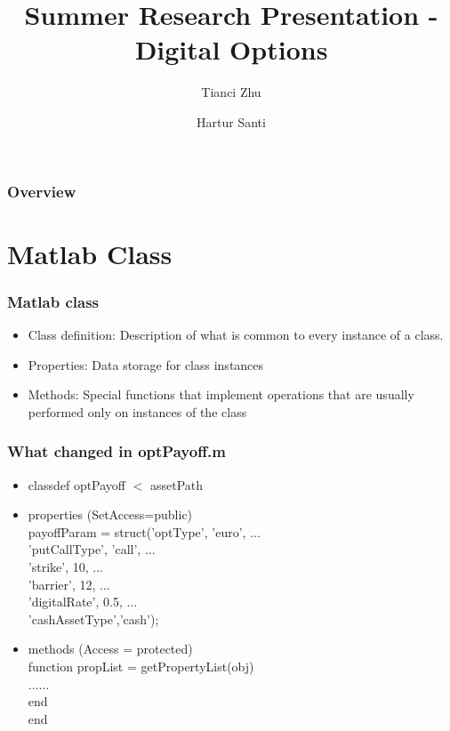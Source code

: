 \documentclass[10pt,Compress]{beamer}
\title[Options]{Summer Research Presentation - Digital Options}
\author{Tianci Zhu \and Hartur Santi}
\institute[IIT]{Illinois Institute of Technology}
\begin{document}
\titlepage


\begin{frame}
\frametitle{Overview}
\tableofcontents
\end{frame}

\section{Matlab Class}
\begin{frame}
\frametitle{Matlab class}
\begin{itemize}
\item Class definition: Description of what is common to every instance of a class.
\item Properties: Data storage for class instances
\item Methods: Special functions that implement operations that are usually performed only on instances of the class
\end{itemize}
\end{frame}

\begin{frame}
\frametitle{What changed in optPayoff.m}
\begin{itemize}
\item classdef optPayoff $<$ assetPath
\item properties (SetAccess=public) \\
\hspace{0.5 cm} payoffParam = struct('optType', {{'euro'}}, ...\\
 \hspace{1.2cm}  'putCallType', {{'call'}}, ...\\ 
 \hspace{1.2cm}       'strike', 10, ... \\
 \hspace{1.2cm}        'barrier', 12, ... \\
 \hspace{1.2cm}      'digitalRate', 0.5, ...\\
 \hspace{1.2cm}     'cashAssetType',{{'cash'}}); 
 \item  methods (Access = protected)\\
 
      \hspace{0.5 cm}function propList = getPropertyList(obj)\\
     \hspace{0.5 cm} ......\\
         \hspace{0.5 cm}end\\
   end
 \end{itemize}
\end{frame}
\end{document}
